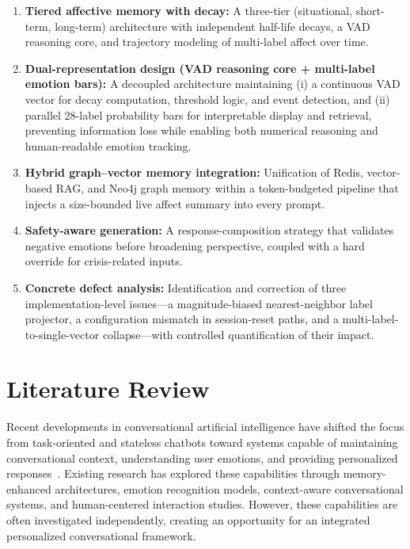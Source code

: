 \documentclass[graybox]{svmult}
\begin{document}
\begin{enumerate}


\item \textbf{Tiered affective memory with decay:} A three-tier (situational, short-term, long-term) architecture with independent half-life decays, a VAD reasoning core, and trajectory modeling of multi-label affect over time.

\item \textbf{Dual-representation design (VAD reasoning core + multi-label emotion bars):}
A decoupled architecture maintaining (i) a continuous VAD vector for decay computation, threshold logic, and event detection, and (ii) parallel 28-label probability bars for interpretable display and retrieval, preventing information loss while enabling both numerical reasoning and human-readable emotion tracking.

\item \textbf{Hybrid graph–vector memory integration:} Unification of Redis, vector-based RAG, and Neo4j graph memory within a token-budgeted pipeline that injects a size-bounded live affect summary into every prompt.

\item \textbf{Safety-aware generation:} A response-composition strategy that validates negative emotions before broadening perspective, coupled with a hard override for crisis-related inputs.

\item \textbf{Concrete defect analysis:} Identification and correction of three implementation-level issues—a magnitude-biased nearest-neighbor label projector, a configuration mismatch in session-reset paths, and a multi-label-to-single-vector collapse—with controlled quantification of their impact.

\end{enumerate}




\section{Literature Review}

Recent developments in conversational artificial intelligence have shifted the focus from task-oriented and stateless chatbots toward systems capable of maintaining conversational context, understanding user emotions, and providing personalized responses~\cite{zhong2024memorybank,packer2023memgpt,rashkin2019empathetic,liu2021esconv}. Existing research has explored these capabilities through memory-enhanced architectures, emotion recognition models, context-aware conversational systems, and human-centered interaction studies. However, these capabilities are often investigated independently, creating an opportunity for an integrated personalized conversational framework.
\end{document}
